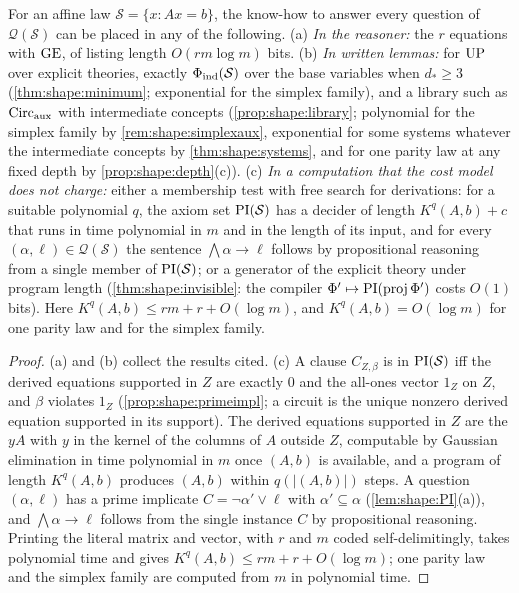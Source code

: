 \begin{proposition}\label{prop:shape:homes}
For an affine law $\mathcal S=\{x:Ax=b\}$, the know-how to answer every question of $\mathcal Q(\mathcal S)$ can be placed in any of the following.
(a) \emph{In the reasoner:} the $r$ equations with $\mathrm{GE}$, of listing length $O(rm\log m)$ bits.
(b) \emph{In written lemmas:} for $\mathrm{UP}$ over explicit theories, exactly $\Phi_{\rm ind}(\mathcal S)$ over the base variables when $d_*\ge3$ (\cref{thm:shape:minimum}; exponential for the simplex family), and a library such as $\mathrm{Circ}_{\rm aux}$ with intermediate concepts (\cref{prop:shape:library}; polynomial for the simplex family by \cref{rem:shape:simplexaux}, exponential for some systems whatever the intermediate concepts by \cref{thm:shape:systems}, and for one parity law at any fixed depth by \cref{prop:shape:depth}(c)).
(c) \emph{In a computation that the cost model does not charge:} either a membership test with free search for derivations: for a suitable polynomial $q$, the axiom set $\mathrm{PI}(\mathcal S)$ has a decider of length $K^q(A,b)+c$ that runs in time polynomial in $m$ and in the length of its input, and for every $(\alpha,\ell)\in\mathcal Q(\mathcal S)$ the sentence $\bigwedge\alpha\to\ell$ follows by propositional reasoning from a single member of $\mathrm{PI}(\mathcal S)$; or a generator of the explicit theory under program length (\cref{thm:shape:invisible}: the compiler $\Phi'\mapsto\mathrm{PI}(\operatorname{proj}\Phi')$ costs $O(1)$ bits). Here $K^q(A,b)\le rm+r+O(\log m)$, and $K^q(A,b)=O(\log m)$ for one parity law and for the simplex family.
\end{proposition}

\begin{proof}
(a) and (b) collect the results cited. (c) A clause $C_{Z,\beta}$ is in $\mathrm{PI}(\mathcal S)$ iff the derived equations supported in $Z$ are exactly $0$ and the all-ones vector $1_Z$ on $Z$, and $\beta$ violates $1_Z$ (\cref{prop:shape:primeimpl}; a circuit is the unique nonzero derived equation supported in its support). The derived equations supported in $Z$ are the $yA$ with $y$ in the kernel of the columns of $A$ outside $Z$, computable by Gaussian elimination in time polynomial in $m$ once $(A,b)$ is available, and a program of length $K^q(A,b)$ produces $(A,b)$ within $q(\lvert(A,b)\rvert)$ steps. A question $(\alpha,\ell)$ has a prime implicate $C=\neg\alpha'\vee\ell$ with $\alpha'\subseteq\alpha$ (\cref{lem:shape:PI}(a)), and $\bigwedge\alpha\to\ell$ follows from the single instance $C$ by propositional reasoning. Printing the literal matrix and vector, with $r$ and $m$ coded self-delimitingly, takes polynomial time and gives $K^q(A,b)\le rm+r+O(\log m)$; one parity law and the simplex family are computed from $m$ in polynomial time.
\end{proof}

